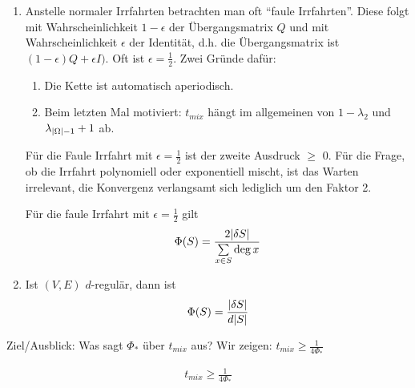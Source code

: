\begin{beweis}
	\begin{enumerate}
		\item Anstelle normaler Irrfahrten betrachten man oft \enquote{faule Irrfahrten}. Diese folgt mit Wahrscheinlichkeit $1-\epsilon$ der Übergangsmatrix $Q$ und mit Wahrscheinlichkeit $\epsilon$ der Identität, d.h. die Übergangsmatrix ist $(1-\epsilon) Q + \epsilon I)$. Oft ist $\epsilon = \frac{1}{2}$. Zwei Gründe dafür: 
		\begin{enumerate}[i]
			\item Die Kette ist automatisch aperiodisch.
			\item Beim letzten Mal motiviert: $t_{mix}$ hängt im allgemeinen von $1-\lambda_2$ und $\lambda_{\lvert\Omega\rvert -1} +1$ ab. 
		\end{enumerate}
	Für die Faule Irrfahrt mit $\epsilon = \frac{1}{2}$ ist der zweite Ausdruck $\geq$ 0. Für die Frage, ob die Irrfahrt polynomiell oder exponentiell mischt, ist das Warten irrelevant, die Konvergenz verlangsamt sich lediglich um den Faktor 2. 
		
		Für die faule Irrfahrt mit $\epsilon = \frac{1}{2}$ gilt
		\begin{align}
			\Phi(S) = \frac{2 \lvert\delta S\rvert}{\sum\limits_{x \in S} \deg x}
		\end{align}
		\item Ist $(V,E)$ $d$-regulär, dann ist
		\begin{align}
			\Phi(S) = \frac{\lvert\delta S\rvert}{d \lvert S\rvert}
		\end{align}
	\end{enumerate}
	Ziel/Ausblick: Was sagt $\Phi_*$ über $t_{mix}$ aus? Wir zeigen: $t_{mix} \geq \frac{1}{4\Phi_*}$
\end{beweis} 
\begin{satz}
	\begin{align}
		t_{mix} \geq \frac{1}{4\Phi_*}
	\end{align}
\end{satz}
